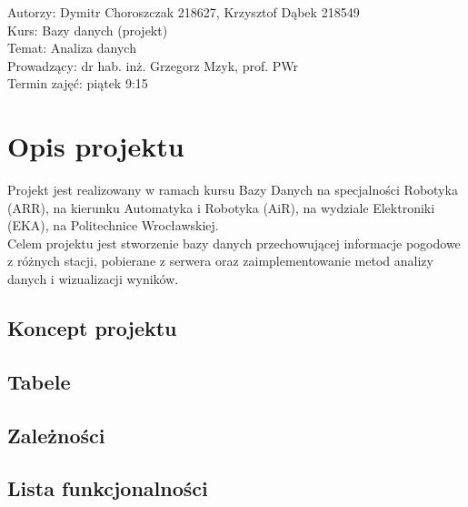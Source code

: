 \documentclass[12pt,a4paper]{article}
\begin{document}
\vspace{20pt}

\flushleft Autorzy: Dymitr Choroszczak 218627, Krzysztof Dąbek 218549\\
Kurs: Bazy danych (projekt)\\
Temat: Analiza danych\\
Prowadzący: dr hab. inż. Grzegorz Mzyk, prof. PWr\\
Termin zajęć: piątek 9:15\\


\newpage

\tableofcontents

\newpage

\section{Opis projektu}
\normalsize
Projekt jest realizowany w ramach kursu Bazy Danych na specjalności Robotyka (ARR), na kierunku Automatyka i Robotyka (AiR), na wydziale Elektroniki (EKA), na Politechnice Wrocławskiej.\\
Celem projektu jest stworzenie bazy danych przechowującej informacje pogodowe z różnych stacji, pobierane z serwera oraz zaimplementowanie metod analizy danych i wizualizacji wyników.\\


\subsection{Koncept projektu}

\subsection{Tabele}

\subsection{Zależności}

\subsection{Lista funkcjonalności}
\end{document}
